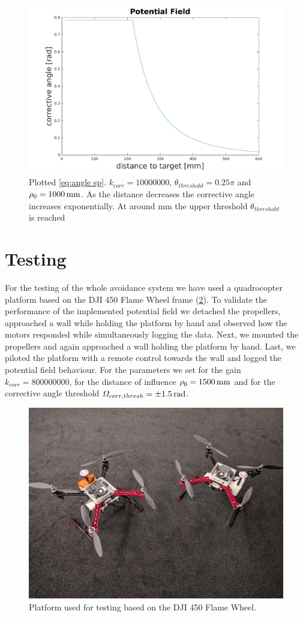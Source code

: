\begin{figure}
	\centering
	\includegraphics[width=0.8\linewidth]{pictures/plot_pf_matlab.pdf}
	\caption{Plotted \cref{eq:angle sp}. $k_{corr}=10000000$, $\theta_{threshold}=0.25\pi$ and $\rho_0=\unit[1000]{mm}$. As the distance decreases the corrective angle increases exponentially. At around \unit[200]{mm} the upper threshold $\theta_{threshold}$ is reached}
	\label{fig:pf matlab}
\end{figure}


\section{Testing}
\label{sec:testing}
For the testing of the whole avoidance system we have used a quadrocopter platform based on the DJI 450 Flame Wheel frame (\cref{fig:loon}). To validate the performance of the implemented potential field we detached the propellers, approached a wall while holding the platform by hand and observed how the motors responded while simultaneously logging the data. Next, we mounted the propellers and again approached a wall holding the platform by hand. Last, we piloted the platform with a remote control towards the wall and logged the potential field behaviour. For the parameters we set for the gain $k_{corr}=800000000$, for the distance of influence $\rho_0=\unit[1500]{mm}$ and for the corrective angle threshold $\Omega_{corr,thresh}=\unit[\pm1.5]{rad}$.
\begin{figure}
	\centering
	\includegraphics[width=0.62\linewidth]{pictures/loons.jpg}
	\caption{Platform used for testing based on the DJI 450 Flame Wheel.}
	\label{fig:loon}
\end{figure}